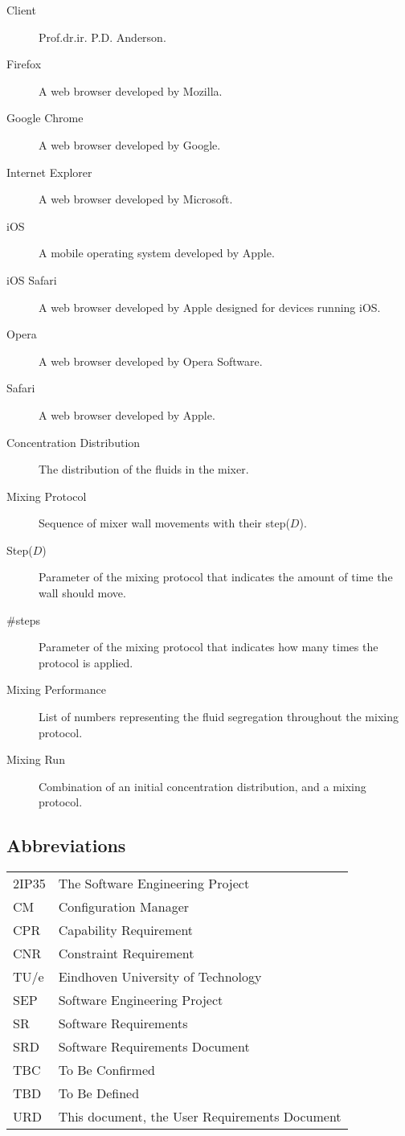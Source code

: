 \begin{description}
\item[Client] Prof.dr.ir. P.D. Anderson.
\item[Firefox] A web browser developed by Mozilla.
\item[Google Chrome] A web browser developed by Google.
\item[Internet Explorer] A web browser developed by Microsoft.
\item[iOS] A mobile operating system developed by Apple.
\item[iOS Safari] A web browser developed by Apple designed for devices running iOS.
\item[Opera] A web browser developed by Opera Software.
\item[Safari] A web browser developed by Apple.
\item[Concentration Distribution] The distribution of the fluids in the mixer.
\item[Mixing Protocol] Sequence of mixer wall movements with their step($D$).
\item[Step($D$)] Parameter of the mixing protocol that indicates the amount of time the wall should move.
\item[\#steps] Parameter of the mixing protocol that indicates how many times the protocol is applied.
\item[Mixing Performance] List of numbers representing the fluid segregation throughout the mixing protocol.
\item[Mixing Run] Combination of an initial concentration distribution, and a mixing protocol.
\end{description}

\subsection{Abbreviations}
\begin{tabular}{l|l}
2IP35 & The Software Engineering Project \\
CM    &Configuration Manager \\
CPR & Capability Requirement \\
CNR & Constraint Requirement \\
TU/e  &Eindhoven University of Technology \\
SEP   &Software Engineering Project \\
SR    &Software Requirements \\
SRD   &Software Requirements Document \\
TBC & To Be Confirmed \\
TBD & To Be Defined \\
URD & This document, the User Requirements Document \\
\end{tabular}

